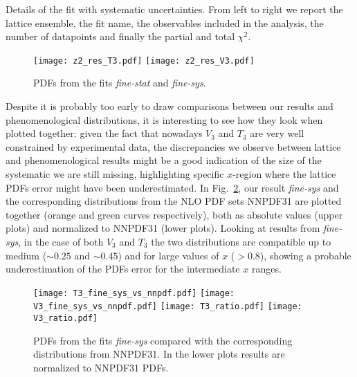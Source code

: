 \begin{table}[t]
    \renewcommand*{\arraystretch}{1.60}
    \scriptsize
    \centering
    
    \vspace{0.3cm}
    \caption{Details of the fit with systematic uncertainties. 
	From left to right we report the lattice ensemble, the fit name, 
	the observables included in the analysis, the number of datapoints and finally
	the partial and total $\chi^2$.}
    \label{tab:chi2_sys}
\end{table}
    
\begin{figure}[h!]
    \center
    \texttt{[image: z2\_res\_T3.pdf]}
    \texttt{[image: z2\_res\_V3.pdf]}
    \caption{PDFs from the fits \textit{fine-stat} and \textit{fine-sys}.}
    \label{fig::fits_z2}
\end{figure}

%
Despite it is probably too early to draw comparisons between our results and phenomenological distributions, 
it is interesting to see how they look when plotted together: given the fact that nowadays $V_3$ and $T_3$ are
very well constrained by experimental data, the discrepancies we observe between lattice and phenomenological results
might be a good indication of the size of the systematic we are still missing, highlighting specific $x$-region
where the lattice PDFs error might have been underestimated. 
In Fig.~\ref{fig::fits_ratio},
our result \textit{fine-sys} and the corresponding distributions from the NLO PDF sets
NNPDF31 \cite{Ball:2017nwa} are plotted together (orange and green curves respectively), both as
absolute values (upper plots) and normalized to NNPDF31 (lower plots). 
Looking at results from \textit{fine-sys}, in the case of both $V_3$ and $T_3$ the two distributions are compatible 
up to medium ($\sim 0.25$ and $\sim 0.45 $)
and for large values of $x$ ($ >0.8$), showing a probable underestimation of the PDFs error for the intermediate $x$ ranges. 
\begin{figure}[h!]
    \center
    \texttt{[image: T3\_fine\_sys\_vs\_nnpdf.pdf]}
    \texttt{[image: V3\_fine\_sys\_vs\_nnpdf.pdf]}
    \texttt{[image: T3\_ratio.pdf]}
    \texttt{[image: V3\_ratio.pdf]}
    \caption{PDFs from the fits \textit{fine-sys} compared with the corresponding distributions from NNPDF31. 
    In the lower plots results are normalized to NNPDF31 PDFs.}
    \label{fig::fits_ratio}
\end{figure}

